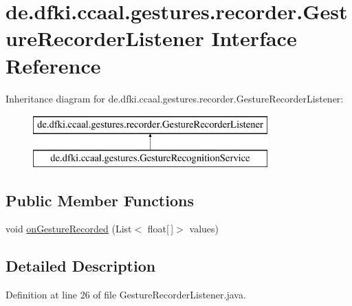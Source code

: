 \hypertarget{interfacede_1_1dfki_1_1ccaal_1_1gestures_1_1recorder_1_1_gesture_recorder_listener}{\section{de.\-dfki.\-ccaal.\-gestures.\-recorder.\-Gesture\-Recorder\-Listener Interface Reference}
\label{interfacede_1_1dfki_1_1ccaal_1_1gestures_1_1recorder_1_1_gesture_recorder_listener}
}
Inheritance diagram for de.\-dfki.\-ccaal.\-gestures.\-recorder.\-Gesture\-Recorder\-Listener\-:\begin{figure}[H]
\begin{center}
\leavevmode
\includegraphics[height=2.000000cm]{interfacede_1_1dfki_1_1ccaal_1_1gestures_1_1recorder_1_1_gesture_recorder_listener}
\end{center}
\end{figure}
\subsection*{Public Member Functions}
\begin{DoxyCompactItemize}
\item 
void \hyperlink{interfacede_1_1dfki_1_1ccaal_1_1gestures_1_1recorder_1_1_gesture_recorder_listener_aee76e5a6b605ee6e9e0b9a91e6f6b47c}{on\-Gesture\-Recorded} (List$<$ float\mbox{[}$\,$\mbox{]}$>$ values)
\end{DoxyCompactItemize}


\subsection{Detailed Description}


Definition at line 26 of file Gesture\-Recorder\-Listener.\-java.



